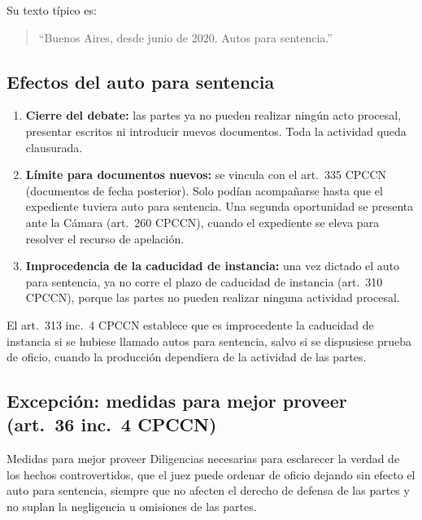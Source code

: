 \documentclass[12pt,oneside]{book}
\begin{document}
Su texto típico es:

\begin{quote}
``Buenos Aires, desde junio de 2020. Autos para sentencia.''
\end{quote}

\subsection{Efectos del auto para sentencia}

\begin{enumerate}
    \item \textbf{Cierre del debate:} las partes ya no pueden realizar ningún acto procesal, presentar escritos ni introducir nuevos documentos. Toda la actividad queda clausurada.
    \item \textbf{Límite para documentos nuevos:} se vincula con el art.~335 CPCCN (documentos de fecha posterior). Solo podían acompañarse hasta que el expediente tuviera auto para sentencia. Una segunda oportunidad se presenta ante la Cámara (art.~260 CPCCN), cuando el expediente se eleva para resolver el recurso de apelación.
    \item \textbf{Improcedencia de la caducidad de instancia:} una vez dictado el auto para sentencia, ya no corre el plazo de caducidad de instancia (art.~310 CPCCN), porque las partes no pueden realizar ninguna actividad procesal.
\end{enumerate}

El art.~313 inc.~4 CPCCN establece que es improcedente la caducidad de instancia si se hubiese llamado autos para sentencia, salvo si se dispusiese prueba de oficio, cuando la producción dependiera de la actividad de las partes.

\subsection{Excepción: medidas para mejor proveer (art.~36 inc.~4 CPCCN)}

\begin{definition}{Medidas para mejor proveer}
Diligencias necesarias para esclarecer la verdad de los hechos controvertidos, que el juez puede ordenar de oficio dejando sin efecto el auto para sentencia, siempre que no afecten el derecho de defensa de las partes y no suplan la negligencia u omisiones de las partes.
\end{definition}
\end{document}
